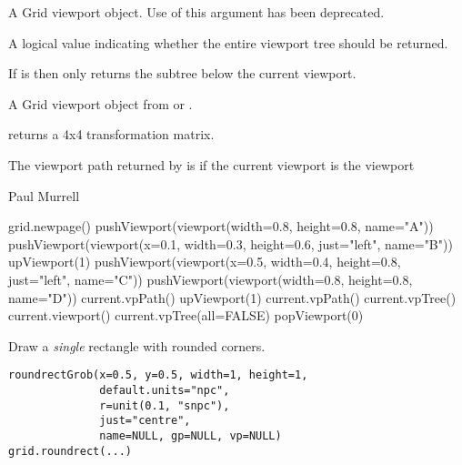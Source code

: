 %
\begin{Arguments}
\begin{ldescription}
\item[\code{vp}] A Grid viewport object.  Use of this argument has been deprecated.
\item[\code{all}] A logical value indicating whether the entire viewport
tree should be returned.
\end{ldescription}
\end{Arguments}
%
\begin{Details}\relax
If  is  then
 only returns the subtree below
the current viewport.
\end{Details}
%
\begin{Value}
A Grid viewport object from  or
.

 returns a 4x4 transformation matrix.

The viewport path returned by  is 
if the current viewport is the  viewport
\end{Value}
%
\begin{Author}\relax
Paul Murrell
\end{Author}
%
\begin{SeeAlso}\relax
{}
\end{SeeAlso}
%
\begin{Examples}
\begin{ExampleCode}
grid.newpage()
pushViewport(viewport(width=0.8, height=0.8, name="A"))
pushViewport(viewport(x=0.1, width=0.3, height=0.6,
  just="left", name="B"))
upViewport(1)
pushViewport(viewport(x=0.5, width=0.4, height=0.8,
  just="left", name="C"))
pushViewport(viewport(width=0.8, height=0.8, name="D"))
current.vpPath()
upViewport(1)
current.vpPath()
current.vpTree()
current.viewport()
current.vpTree(all=FALSE)
popViewport(0)
\end{ExampleCode}
\end{Examples}
%
\begin{Description}\relax
Draw a \emph{single} rectangle with rounded corners.
\end{Description}
%
\begin{Usage}
\begin{verbatim}
roundrectGrob(x=0.5, y=0.5, width=1, height=1,
              default.units="npc",
              r=unit(0.1, "snpc"),
              just="centre",
              name=NULL, gp=NULL, vp=NULL) 
grid.roundrect(...) 
\end{verbatim}
\end{Usage}
